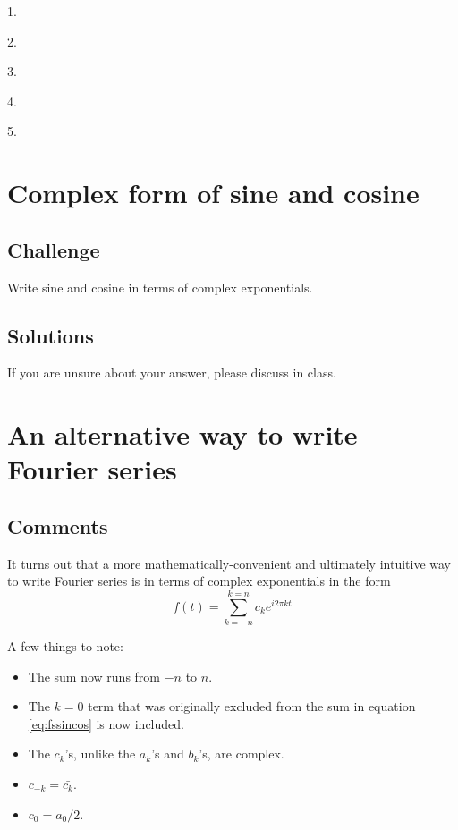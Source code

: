 1.\\

2.\\

3.\\

4.\\

5.\\




\newpage

\section{Complex form of sine and cosine}

\subsection*{Challenge}
Write sine and cosine in terms of complex exponentials.

\subsection*{Solutions}
If you are unsure about your answer, please discuss in class.




\newpage
\section{An alternative way to write Fourier series}
\label{sec:expfs}

\subsection*{Comments}
It turns out that a more mathematically-convenient and ultimately intuitive way to write Fourier series is in terms of complex exponentials in the form
\begin{equation}
    \label{eq:fsexp}
    f(t) = \sum_{k=-n}^{k=n} c_k e^{i 2 \pi k t}
\end{equation}

A few things to note:
\begin{itemize}
    \item The sum now runs from $-n$ to $n$.
    \item The $k=0$ term that was originally excluded from the sum in equation \ref{eq:fssincos} is now included.
    \item The $c_k$'s, unlike the $a_k$'s and $b_k$'s, are complex.
    \item $c_{-k} = \bar{c_k}$.
    \item $c_0 = a_0/2$.
\end{itemize}

